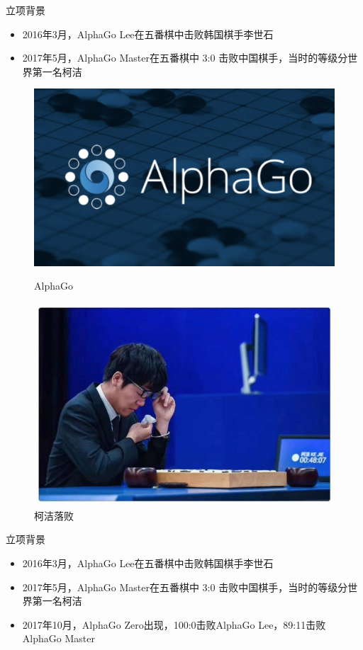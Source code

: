 \documentclass[compress]{beamer}
\begin{document}
\begin{frame}{立项背景}
  \begin{itemize}
    \item 2016年3月，AlphaGo Lee在五番棋中击败韩国棋手李世石
    \item 2017年5月，AlphaGo Master在五番棋中 3:0 击败中国棋手，当时的等级分世界第一名柯洁        
  \end{itemize}
  \begin{figure}[htbp]
    \centering
	\begin{minipage}[t]{0.4\textwidth}
	  \centering
      \includegraphics[width=0.9\linewidth]{alphago.jpg}
      \caption{AlphaGo}
    \end{minipage}
    \begin{minipage}[t]{0.4\textwidth}
	  \centering
      \includegraphics[width=0.9\linewidth]{Kejie.jpg}
      \caption{柯洁落败}
    \end{minipage}
  \end{figure}
\end{frame}

\begin{frame}{立项背景}
  \begin{itemize}
    \item 2016年3月，AlphaGo Lee在五番棋中击败韩国棋手李世石
    \item 2017年5月，AlphaGo Master在五番棋中 3:0 击败中国棋手，当时的等级分世界第一名柯洁        
    \item 2017年10月，AlphaGo Zero出现，100:0击败AlphaGo Lee，89:11击败AlphaGo Master
  \end{itemize}
\end{frame}
\end{document}
